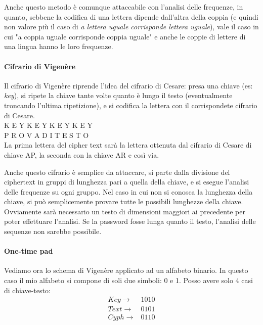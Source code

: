 \noindent Anche questo metodo è comunque attaccabile con l'analisi delle frequenze, in quanto, sebbene la codifica di una lettera dipende dall'altra della coppia (e quindi non valore più il caso di \textit{a lettera uguale corrisponde lettera uguale}), vale il caso in cui "a coppia uguale corrisponde coppia uguale" e anche le coppie di lettere di una lingua hanno le loro frequenze.

\paragraph{Cifrario di Vigenère} Il cifrario di Vigenère riprende l'idea del cifrario di Cesare: presa una chiave (es: \textit{key}), si ripete la chiave tante volte quanto è lungo il testo (eventualmente troncando l'ultima ripetizione), e si codifica la lettera con il corrispondete cifrario di Cesare. \\
	
\noindent
K E Y K E Y K E Y K E Y \\
P R O V A D I T E S T O \\
	
\noindent La prima lettera del cipher text sarà la lettera ottenuta dal cifrario di Cesare di chiave AP, la seconda con la chiave AR e così via.
	
Anche questo cifrario è semplice da attaccare, si parte dalla divisione del ciphertext in gruppi di lunghezza pari a quella della chiave, e si esegue l'analisi delle frequenze su ogni gruppo. Nel caso in cui non si conosca la lunghezza della chiave, si può semplicemente provare tutte le possibili lunghezze della chiave. Ovviamente sarà necessario un testo di dimensioni maggiori ai precedente per poter effettuare l'analisi. Se la password fosse lunga quanto il testo, l'analisi delle sequenze non sarebbe possibile.
	
\paragraph{One-time pad} Vediamo ora lo schema di Vigenère applicato ad un alfabeto binario. In questo caso il mio alfabeto si compone di soli due simboli: 0 e 1. Posso avere solo 4 casi di chiave-testo:
\begin{align*}
Key \rightarrow &1 0 1 0 \\
Text \rightarrow &0 1 0 1 \\
Cyph \rightarrow &0 1 1 0 \\
\end{align*}

